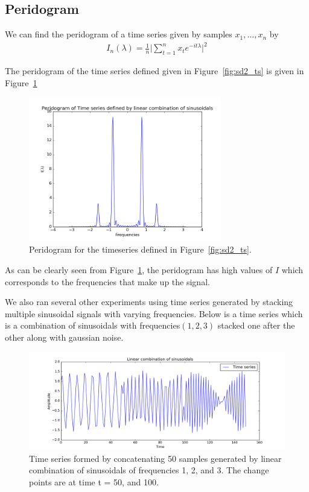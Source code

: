 \documentclass{article}
\begin{document}
\subsection{Peridogram}

We can find the peridogram of a time series given by samples ${x_{1}, \ldots, x_{n}}$ by
\begin{align}
  I_{n}(\lambda) = \frac{1}{n} \lvert\sum_{t=1}^{n} x_{t}e^{-it\lambda} \rvert^{2}
\end{align}

The peridogram of the time series defined given in Figure~\ref{fig:sd2_ts} is given in Figure~\ref{fig:sd2_peri1}

\begin{figure}[ht!]
  \centering
  \includegraphics[width=0.75\textwidth]{images/spectral_density_2/peri1}
  \caption{Peridogram for the timeseries defined in Figure~\ref{fig:sd2_ts}.\label{fig:sd2_peri1}}
\end{figure}

As can be clearly seen from Figure~\ref{fig:sd2_peri1}, the peridogram has high values of $I$ which corresponds to the frequencies that make up the signal.

We also ran several other experiments using time series generated by stacking multiple sinusoidal signals with varying frequencies.  Below is a time series which is a combination of sinusoidals with frequencies$(1, 2, 3)$ stacked one after the other along with gaussian noise.

\begin{figure}[ht!]
  \centering
  \includegraphics[width=1\textwidth]{images/spectral_density_2/ts2}
  \caption{Time series formed by concatenating 50 samples generated by linear combination of sinusoidals of frequencies 1, 2, and 3.  The change points are at time t = 50, and 100.\label{fig:sd2_ts2}}
\end{figure}
\end{document}
